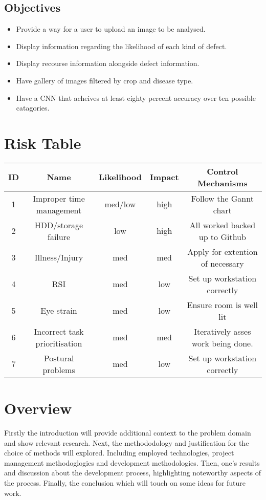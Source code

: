   \subsection{Objectives}
    \begin{itemize}
      \item Provide a way for a user to upload an image to be analysed.
      \item Display information regarding the likelihood of each kind of defect.
      \item Display recourse information alongside defect information.
      \item Have gallery of images filtered by crop and disease type.
      \item Have a CNN that acheives at least eighty percent accuracy over ten possible catagories.
    \end{itemize}

  \section{Risk Table}
  \begin{tabular}{|c|c|c|c|c|}
  \hline
  ID & Name & Likelihood & Impact & Control Mechanisms\tabularnewline
  \hline
  \hline
  1 & Improper time management & med/low & high & Follow the Gannt chart\tabularnewline
  \hline
  2 & HDD/storage failure & low & high & All worked backed up to Github\tabularnewline
  \hline
  3 & Illness/Injury & med & med & Apply for extention of necessary\tabularnewline
  \hline
  4 & RSI & med & low & Set up workstation correctly\tabularnewline
  \hline
  5 & Eye strain & med & low & Ensure room is well lit\tabularnewline
  \hline
  6 & Incorrect task prioritisation & med & med & Iteratively asses work being done.\tabularnewline
  \hline
  7 & Postural problems & med & low & Set up workstation correctly\tabularnewline
  \hline
  \end{tabular}


\section{Overview}
  Firstly the introduction will provide additional context to the problem domain and show relevant research. Next, the methododology and justification for the choice of methods will explored. Including employed technologies, project management methodoglogies and development methodologies. Then, one's results and discussion about the development process, highlighting noteworthy aspects of the process. Finally, the conclusion which will touch on some ideas for future work.

